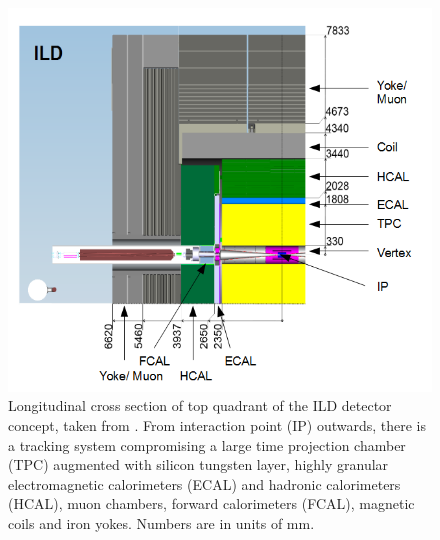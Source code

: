 \documentclass[a4paper,11pt]{article}
\begin{document}




\begin{figure}[htbp]
\centering %

\includegraphics[width=.45\textwidth]{plots/ILD2}
\qquad
\caption{\label{fig:ILD} Longitudinal cross section of top quadrant of the ILD detector concept, taken from \cite{Behnke:2007gj}. From interaction point (IP) outwards, there is a tracking system compromising a large time projection chamber (TPC) augmented with silicon tungsten layer, highly granular electromagnetic calorimeters (ECAL) and hadronic calorimeters (HCAL), muon chambers, forward calorimeters (FCAL), magnetic coils and iron yokes. Numbers are in units of mm.
}
\end{figure}
\end{document}
